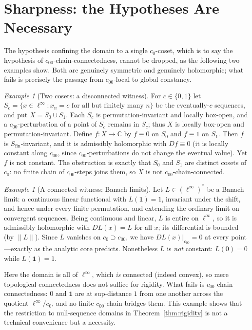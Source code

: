 \documentclass[11pt]{amsart}
\newcommand{\CC}{\mathbb{C}}
\newcommand{\Sfin}{S_{\mathrm{fin}}}
\newcommand{\cc}{c_{00}}
\newcommand{\czero}{c_{0}}
\theoremstyle{plain}
\theoremstyle{definition}
\theoremstyle{remark}
\newtheorem{example}[theorem]{Example}
\begin{document}
\section{Sharpness: the Hypotheses Are Necessary}
\label{sec:sharpness}

The hypothesis confining the domain to a single $\czero$-coset, which is to
say the hypothesis of $\cc$-chain-connectedness, cannot be dropped, as the
following two examples show. Both are genuinely symmetric and genuinely holomorphic; what fails is
precisely the passage from $\cc$-local to global constancy.

\begin{example}[Two cosets: a disconnected witness]
\label{ex:twocosets}
For $c\in\{0,1\}$ let $S_c=\{x\in\ell^\infty : x_n=c \text{ for all but
finitely many } n\}$ be the eventually-$c$ sequences, and put $X=S_0\cup
S_1$. Each $S_c$ is permutation-invariant and locally box-open, and a
$\cc$-perturbation of a point of $S_c$ remains in $S_c$; thus $X$ is
locally box-open and permutation-invariant. Define $f:X\to\CC$ by $f\equiv
0$ on $S_0$ and $f\equiv 1$ on $S_1$. Then $f$ is $\Sfin$-invariant, and it
is admissibly holomorphic with $Df\equiv 0$ (it is locally constant along
$\cc$, since $\cc$-perturbations do not change the eventual value). Yet $f$
is not constant. The obstruction is exactly that $S_0$ and $S_1$ are
distinct cosets of $\czero$: no finite chain of $\cc$-steps joins them, so
$X$ is not $\cc$-chain-connected.
\end{example}

\begin{example}[A connected witness: Banach limits]
\label{ex:banach}
Let $L\in(\ell^\infty)^*$ be a Banach limit: a continuous linear functional
with $L(\mathbf 1)=1$, invariant under the shift, and hence under every
finite permutation, and extending the ordinary limit on convergent
sequences. Being continuous and linear, $L$ is entire on $\ell^\infty$, so
it is admissibly holomorphic with $DL(x)=L$ for all $x$; its differential is
bounded (by $\|L\|$). Since $L$ vanishes on $\czero\supset\cc$, we have
$DL(x)|_{\cc}=0$ at every point---exactly as the analytic core predicts.
Nonetheless $L$ is \emph{not} constant: $L(0)=0$ while $L(\mathbf 1)=1$.

Here the domain is all of $\ell^\infty$, which \emph{is} connected (indeed
convex), so mere topological connectedness does not suffice for rigidity.
What fails is $\cc$-chain-connectedness: $0$ and $\mathbf 1$ are at
sup-distance $1$ from one another across the quotient
$\ell^\infty/\czero$, and no finite $\cc$-chain bridges them. This example
shows that the restriction to null-sequence domains in
Theorem~\ref{thm:rigidity} is not a technical convenience but a
necessity.
\end{example}
\end{document}

